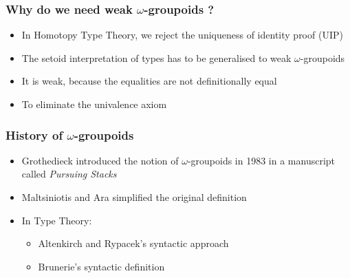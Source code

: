 \documentclass[12pt, mathserif,handout]{beamer}
\newcommand{\og}{ $\omega$-groupoids}
\newcommand{\wog}{weak $\omega$-groupoids}
\begin{document}
\begin{frame}

\frametitle{Why do we need \wog{} ?}

\begin{itemize}
\item{In Homotopy Type Theory, we reject the uniqueness of identity proof (UIP)}
\pause
\item {The setoid interpretation of types has to be generalised to \wog{}}
\pause
\item {It is weak, because the equalities are not definitionally equal}
\pause
\item{To eliminate the univalence axiom}
\end{itemize}

\end{frame}





\begin{frame}

\frametitle{History of \og{}}



\begin{itemize}
\item{Grothedieck introduced the notion of \og{} in 1983 in a manuscript called \emph{Pursuing Stacks}}
\pause
\item{Maltsiniotis and Ara simplified the original definition}
\pause
\item{In Type Theory:
\begin{itemize}
\item {Altenkirch and Rypacek's syntactic approach}
\item{Brunerie's syntactic definition}
\end{itemize}
}
\end{itemize}

\end{frame}
\end{document}
